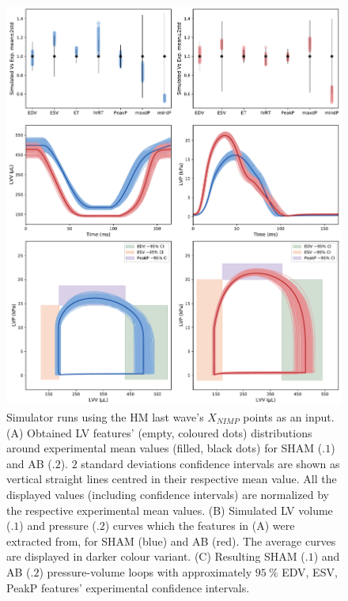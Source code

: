 \begin{figure}[!ht]
    \myfloatalign
    \includegraphics[width=\textwidth]{figures/chapter04/sham_vs_ab_fit.pdf}
    \caption{Simulator runs using the HM last wave’s $X_{NIMP}$ points as an input. (A) Obtained LV features’ (empty, coloured dots) distributions around experimental mean values (filled, black dots) for SHAM (.$1$) and AB (.$2$). $2$ standard deviations confidence intervals are shown as vertical straight lines centred in their respective mean value. All the displayed values (including confidence intervals) are normalized by the respective experimental mean values. (B) Simulated LV volume (.$1$) and pressure (.$2$) curves which the features in (A) were extracted from, for SHAM (blue) and AB (red). The average curves are displayed in darker colour variant. (C) Resulting SHAM (.$1$) and AB (.$2$) pressure-volume loops with approximately $\SI{95}{\percent}$ EDV, ESV, PeakP features’ experimental confidence intervals. }
    \label{fig:simulatormatchtoexpvar}
\end{figure}

